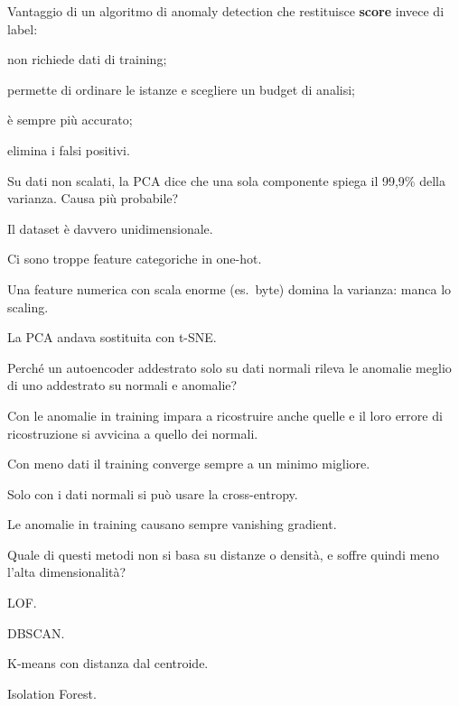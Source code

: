 \begin{domanda}\label{quiz:m40}
Vantaggio di un algoritmo di anomaly detection che restituisce \textbf{score} invece di label:
\begin{opzioni}
  \item non richiede dati di training;
  \item permette di ordinare le istanze e scegliere un budget di analisi;
  \item è sempre più accurato;
  \item elimina i falsi positivi.
\end{opzioni}
\end{domanda}

\begin{domanda}[PCA]\label{quiz:m41}
Su dati non scalati, la PCA dice che una sola componente spiega il 99,9\% della varianza. Causa più probabile?
\begin{opzioni}
  \item Il dataset è davvero unidimensionale.
  \item Ci sono troppe feature categoriche in one-hot.
  \item Una feature numerica con scala enorme (es.\ byte) domina la varianza: manca lo scaling.
  \item La PCA andava sostituita con t-SNE.
\end{opzioni}
\end{domanda}

\begin{domanda}[autoencoder]\label{quiz:m42}
Perché un autoencoder addestrato solo su dati normali rileva le anomalie meglio di uno addestrato su normali e anomalie?
\begin{opzioni}
  \item Con le anomalie in training impara a ricostruire anche quelle e il loro errore di ricostruzione si avvicina a quello dei normali.
  \item Con meno dati il training converge sempre a un minimo migliore.
  \item Solo con i dati normali si può usare la cross-entropy.
  \item Le anomalie in training causano sempre vanishing gradient.
\end{opzioni}
\end{domanda}

\begin{domanda}\label{quiz:m43}
Quale di questi metodi non si basa su distanze o densità, e soffre quindi meno l'alta dimensionalità?
\begin{opzioni}
  \item LOF.
  \item DBSCAN.
  \item K-means con distanza dal centroide.
  \item Isolation Forest.
\end{opzioni}
\end{domanda}

